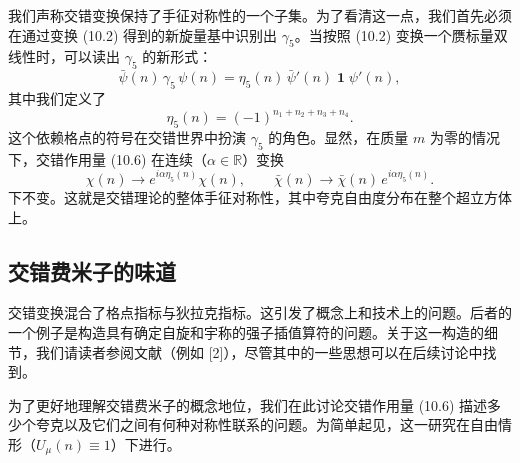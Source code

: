 我们声称交错变换保持了手征对称性的一个子集。为了看清这一点，我们首先必须在通过变换 (10.2) 得到的新旋量基中识别出 $\gamma_5$。当按照 (10.2) 变换一个赝标量双线性时，可以读出 $\gamma_5$ 的新形式：
\begin{equation}
  \bar\psi(n)\, \gamma_5\, \psi(n) = \eta_5(n)\,
  \bar\psi'(n)\; \mathbf{1} \; \psi'(n) ,
\end{equation}
其中我们定义了
\begin{equation}
  \eta_5(n) = (-1)^{n_1 + n_2 + n_3 + n_4} .
\end{equation}
这个依赖格点的符号在交错世界中扮演 $\gamma_5$ 的角色。显然，在质量 $m$ 为零的情况下，交错作用量 (10.6) 在连续（$\alpha \in \mathbb{R}$）变换
\begin{equation}
  \chi(n) \longrightarrow e^{i\alpha\eta_5(n)}\chi(n) , \qquad
  \bar\chi(n) \longrightarrow \bar\chi(n)\, e^{i\alpha\eta_5(n)} .
\end{equation}
下不变。这就是交错理论的整体手征对称性，其中夸克自由度分布在整个超立方体上。

\subsection{交错费米子的味道}

交错变换混合了格点指标与狄拉克指标。这引发了概念上和技术上的问题。后者的一个例子是构造具有确定自旋和宇称的强子插值算符的问题。关于这一构造的细节，我们请读者参阅文献（例如 [2]），尽管其中的一些思想可以在后续讨论中找到。

为了更好地理解交错费米子的概念地位，我们在此讨论交错作用量 (10.6) 描述多少个夸克以及它们之间有何种对称性联系的问题。为简单起见，这一研究在自由情形（$U_\mu(n) \equiv 1$）下进行。

